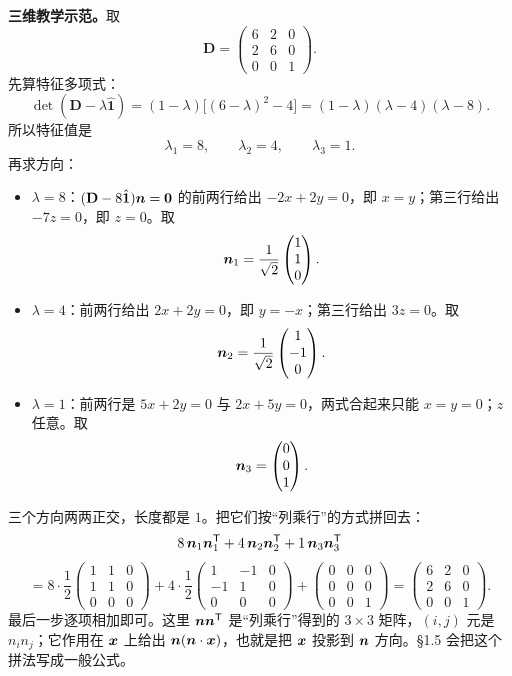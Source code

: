 \documentclass[11pt]{ctexart}
\newcommand{\ten}[1]{\mathbf{#1}}
\newcommand{\unitd}{\hat{\ten{1}}}
\begin{document}
\textbf{三维教学示范。}取
\[
\ten D=\begin{pmatrix}6&2&0\\2&6&0\\0&0&1\end{pmatrix}.
\]
先算特征多项式：
\[
\det(\ten D-\lambda\unitd)
=(1-\lambda)\bigl[(6-\lambda)^2-4\bigr]
=(1-\lambda)(\lambda-4)(\lambda-8).
\]
所以特征值是
\[
\lambda_1=8,\qquad \lambda_2=4,\qquad \lambda_3=1.
\]
再求方向：
\begin{itemize}[leftmargin=1.8em,itemsep=2pt]
\item $\lambda=8$：$(\ten D-8\unitd)\vect n=\vect0$ 的前两行给出 $-2x+2y=0$，即 $x=y$；第三行给出 $-7z=0$，即 $z=0$。取
\[
\boldsymbol{n}_1=\frac{1}{\sqrt2}\begin{pmatrix}1\\1\\0\end{pmatrix}.
\]
\item $\lambda=4$：前两行给出 $2x+2y=0$，即 $y=-x$；第三行给出 $3z=0$。取
\[
\boldsymbol{n}_2=\frac{1}{\sqrt2}\begin{pmatrix}1\\-1\\0\end{pmatrix}.
\]
\item $\lambda=1$：前两行是 $5x+2y=0$ 与 $2x+5y=0$，两式合起来只能 $x=y=0$；$z$ 任意。取
\[
\boldsymbol{n}_3=\begin{pmatrix}0\\0\\1\end{pmatrix}.
\]
\end{itemize}
三个方向两两正交，长度都是 $1$。把它们按“列乘行”的方式拼回去：
\[
8\,\boldsymbol{n}_1\boldsymbol{n}_1^{\mathsf T}
+4\,\boldsymbol{n}_2\boldsymbol{n}_2^{\mathsf T}
+1\,\boldsymbol{n}_3\boldsymbol{n}_3^{\mathsf T}
\]
\[
=8\cdot\frac12\begin{pmatrix}1&1&0\\1&1&0\\0&0&0\end{pmatrix}
+4\cdot\frac12\begin{pmatrix}1&-1&0\\-1&1&0\\0&0&0\end{pmatrix}
+\begin{pmatrix}0&0&0\\0&0&0\\0&0&1\end{pmatrix}
=\begin{pmatrix}6&2&0\\2&6&0\\0&0&1\end{pmatrix}.
\]
最后一步逐项相加即可。这里 $\boldsymbol{n}\boldsymbol{n}^{\mathsf T}$ 是“列乘行”得到的 $3\times3$ 矩阵，$(i,j)$ 元是 $n_in_j$；它作用在 $\boldsymbol{x}$ 上给出 $\boldsymbol{n}(\boldsymbol{n}\cdot\boldsymbol{x})$，也就是把 $\boldsymbol{x}$ 投影到 $\boldsymbol{n}$ 方向。§1.5 会把这个拼法写成一般公式。
\end{document}
